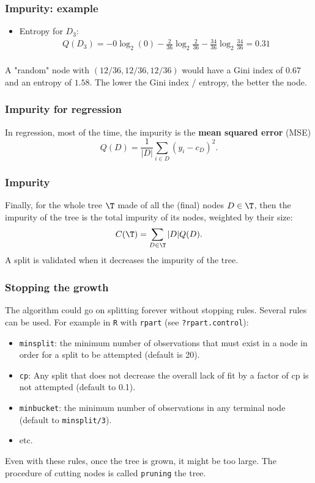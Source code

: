\begin{frame}
\frametitle{Impurity: example}
\begin{itemize}
\item Entropy for $D_3$:
\begin{eqnarray*}
Q(D_3)= -0\log_2(0)-\frac{2}{36}\log_2\frac{2}{36} - \frac{34}{36}\log_2\frac{34}{36}=0.31\\
\end{eqnarray*}
\end{itemize}
A "random" node with $(12/36, 12/36, 12/36)$ would have a Gini index of $0.67$ and an entropy of $1.58$. The lower the Gini index / entropy, the better the node.
\end{frame}
\begin{frame}
\frametitle{Impurity for regression}
In regression, most of the time, the impurity is the {\bf mean squared error} (MSE)
$$
Q(D) = \frac{1}{|D|} \sum_{i\in D}(y_i - c_D)^2.
$$
\end{frame}
\begin{frame}
\frametitle{Impurity}
Finally, for the whole tree ${\T}$ made of all the (final) nodes $D \in \T$, then the impurity of the tree is the total impurity of its nodes, weighted by their size:
$$
C(\T) = \sum_{D \in \T} |D| Q(D).
$$
A split is validated when it decreases the impurity of the tree.\\
\end{frame}
\begin{frame}
\frametitle{Stopping the growth}
The algorithm could go on splitting forever without stopping rules. Several rules can be used. For example in {\tt R} with {\tt rpart} (see {\tt ?rpart.control}):
\begin{itemize}
\item {\tt minsplit}: the minimum number of observations that must exist in a node in order for a split to be attempted (default is 20).
\item {\tt cp}: Any split that does not decrease the overall lack of fit by a factor of cp is not attempted (default to 0.1).
\item {\tt minbucket}: the minimum number of observations in any terminal node (default to {\tt minsplit/3}).  
\item etc.
\end{itemize}
Even with these rules, once the tree is grown, it might be too large. The procedure of cutting nodes is called {\tt pruning} the tree.  
\end{frame}
